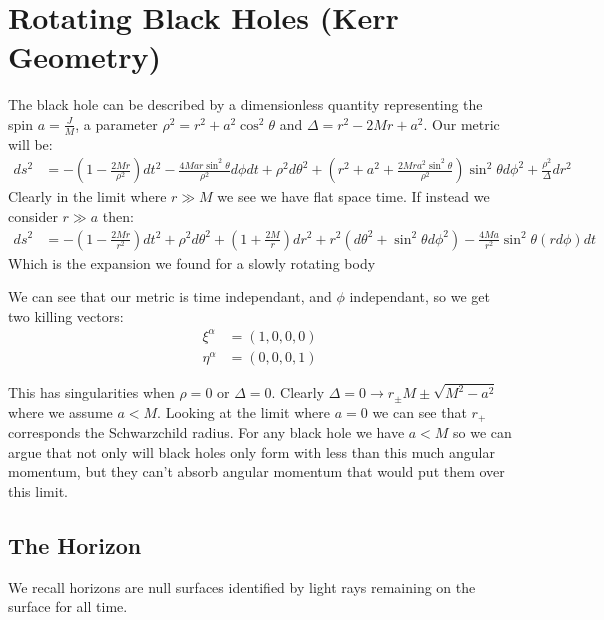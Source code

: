 \section{Rotating Black Holes (Kerr Geometry)}
The black hole can be described by a dimensionless quantity representing the spin $a = \frac{J}{M}$, a parameter $\rho^2 = r^2 + a^2 \cos^2\theta$ and $\Delta = r^2 - 2Mr + a^2$. 
Our metric will be:
\begin{align*}
	ds^2 &= -\left(1-\frac{2Mr}{\rho^2}\right)dt^2 - \frac{4Mar\sin^2\theta}{\rho^2} d\phi dt + \rho^2 d\theta^2 + \left(r^2 + a^2 + \frac{2Mra^2\sin^2\theta}{\rho^2}\right)\sin^2\theta d\phi^2 + \frac{\rho^2}{\Delta} dr^2
\end{align*}
Clearly in the limit where $r \gg M$ we see we have flat space time. If instead we consider $r\gg a$ then:
\begin{align*}
	ds^2 &= -\left(1-\frac{2Mr}{r^2}\right)dt^2 + \rho^2 d\theta^2 + \left(1 + \frac{2M}{r}\right) dr^2 + r^2 (d\theta^2 + \sin^2\theta d\phi^2) - \frac{4Ma}{r^2} \sin^2\theta (rd\phi) dt
\end{align*}
Which is the expansion we found for a slowly rotating body

We can see that our metric is time independant, and $\phi$ independant, so we get two killing vectors:
\begin{align*}
	\xi^\alpha &= (1,0,0,0) \\
	\eta^\alpha &= (0,0,0,1)
\end{align*}

This has singularities when $\rho = 0$ or $\Delta = 0$. Clearly $\Delta = 0 \to r_\pm M \pm \sqrt{M^2 -a^2}$ where we assume $a < M$. Looking at the limit where $a=0$ we can see that $r_+$ corresponds the Schwarzchild radius.
For any black hole we have $a<M$ so we can argue that not only will black holes only form with less than this much angular momentum, but they can't absorb angular momentum that would put them over this limit.

\subsection{The Horizon}
We recall horizons are null surfaces identified by light rays remaining on the surface for all time.

